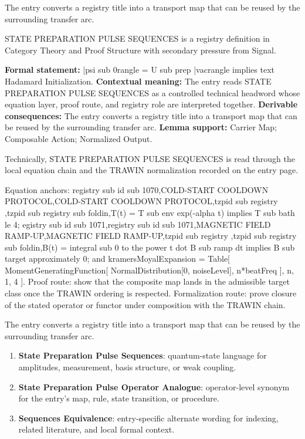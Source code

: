 The entry converts a registry title into a transport map that can be reused by the surrounding transfer arc.
\clearpage


\begingroup\small
{}
STATE PREPARATION PULSE SEQUENCES is a registry definition in Category Theory and Proof Structure with secondary pressure from Signal.

\begingroup\footnotesize\setlength{\emergencystretch}{3em}\sloppy
\textbf{Formal statement:} |psi sub 0rangle = U sub prep |vacrangle implies text Hadamard Initialization. \textbf{Contextual meaning:} The entry reads STATE PREPARATION PULSE SEQUENCES as a controlled technical headword whose equation layer, proof route, and registry role are interpreted together. \textbf{Derivable consequences:} The entry converts a registry title into a transport map that can be reused by the surrounding transfer arc. \textbf{Lemma support:} Carrier Map; Composable Action; Normalized Output.\par
\endgroup

Technically, STATE PREPARATION PULSE SEQUENCES is read through the local equation chain and the TRAWIN normalization recorded on the entry page.

Equation anchors: registry sub id sub 1070,COLD-START COOLDOWN PROTOCOL,COLD-START COOLDOWN PROTOCOL,tzpid sub registry ,tzpid sub registry sub foldin,T(t) = T sub env exp(-alpha t) implies T sub bath le 4; egistry sub id sub 1071,registry sub id sub 1071,MAGNETIC FIELD RAMP-UP,MAGNETIC FIELD RAMP-UP,tzpid sub registry ,tzpid sub registry sub foldin,B(t) = integral sub 0 to the power t dot B sub ramp dt implies B sub target approximately 0; and kramersMoyalExpansion = Table[ MomentGeneratingFunction[ NormalDistribution[0, noiseLevel], n*beatFreq ], n, 1, 4 ]. Proof route: show that the composite map lands in the admissible target class once the TRAWIN ordering is respected. Formalization route: prove closure of the stated operator or functor under composition with the TRAWIN chain.

The entry converts a registry title into a transport map that can be reused by the surrounding transfer arc.
\endgroup

\begin{enumerate}[leftmargin=1.6em,itemsep=6pt,topsep=4pt]
\item \textbf{State Preparation Pulse Sequences}: quantum-state language for amplitudes, measurement, basis structure, or weak coupling.
\item \textbf{State Preparation Pulse Operator Analogue}: operator-level synonym for the entry's map, rule, state transition, or procedure.
\item \textbf{Sequences Equivalence}: entry-specific alternate wording for indexing, related literature, and local formal context.
\end{enumerate}

